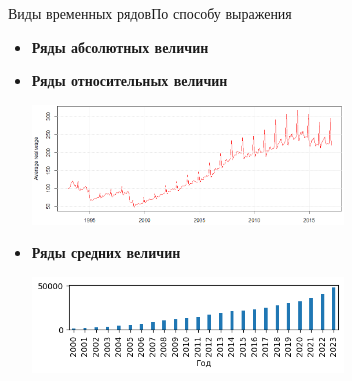 \documentclass[10pt,pdf,utf8,hyperref={unicode},aspectratio=169]{beamer}
\begin{document}
\begin{frame}{Виды временных рядов}{По способу выражения}

\begin{itemize}
	\item \textbf{Ряды абсолютных величин}
	\item \textbf{Ряды относительных величин}
	
	{\centering
		\includegraphics[width=0.65\textwidth]{wage.png}\par
	}

	\item \textbf{Ряды средних величин}
		
	{\centering
		\includegraphics[width=0.65\textwidth]{wage_kirov.png}\par
	}

\end{itemize}

% 
% 

\end{frame}
\end{document}
